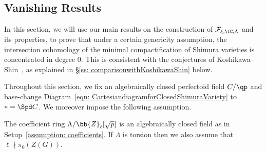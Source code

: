 \documentclass[letterpaper,11pt]{amsart}
\begin{document}
\subsection{Vanishing Results}
In this section, we will use our main results on the construction of $\mathcal{F}_{\xi,\IC, \Lambda}$ and its properties, to prove that under a certain genericity assumption, the intersection cohomology of the minimal compactification of Shimura varieties is concentrated in degree $0$. This is consistent with the conjectures of Koshikawa--Shin~\cite{KoshikawaShin}, as explained in \S \ref{ss: comparisonwithKoshikawaShin} below. 

Throughout this section, we fix an algebraically closed perfectoid field $C/\qp$ and base-change Diagram~\eqref{eqn: CartesiandiagramforClosedShimuraVariety} to $\ast=\Spd C$. We moreover impose the following assumption.
\begin{assumption}{\label{assumption: coefficientsfortexactness}}
The coefficient ring $\Lambda/\bb{Z}_{\ell}[\sqrt{p}]$ is an algebraically closed field as in Setup~\ref{assumption: coefficients}. If $\Lambda$ is torsion then we also assume that $\ell \nmid \pi_{0}(Z(G))$.
\end{assumption}
\end{document}
